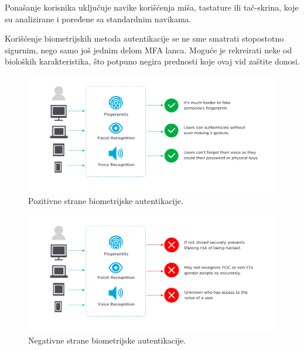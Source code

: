 \documentclass[fleqn, 12pt]{article}
\begin{document}
Ponašanje korisnika uključuje navike korišćenja miša, tastature ili tač-skrina, koje su analizirane i poređene sa standardnim navikama. 

Korišćenje biometrijskih metoda autentikacije se ne sme smatrati stopostotno sigurnim, nego samo još jednim delom MFA lanca. Moguće je rekreirati neke od bioloških karakteristika, što potpuno negira prednosti koje ovaj vid zaštite donosi. \cite{bio}

\begin{figure}[H]
    \centering
    \includegraphics[width=1\linewidth]{bio.png}
    \caption{Pozitivne strane biometrijske autentikacije.\cite{bio}}
    \label{fig:enter-label}
\end{figure}

\begin{figure}[H]
    \centering
    \includegraphics[width=1\linewidth]{bio2.png}
    \caption{Negativne strane biometrijske autentikacije.\cite{bio}}
    \label{fig:enter-label}
\end{figure}
\end{document}
